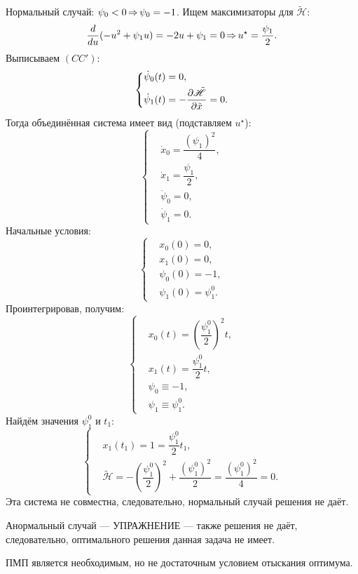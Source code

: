\begin{example}
    Нормальный случай: $\psi_0 < 0 \operatorname*{\Rightarrow} \psi_0 = -1$. Ищем максимизаторы для $\tilde{\mathscr{H}}$:
    $$
        \dfrac{d}{du}(-u^2 + \psi_1 u) = -2u + \psi_1 = 0 \operatorname*{\Rightarrow} u^{\star} = \dfrac{\psi_1}{2}.
    $$
    Выписываем $(CC')$:
    $$
        \left\{
            \begin{aligned}
                & \dot{\psi}_0(t) = 0, \\
                & \dot{\psi}_1(t) = - \dfrac{\partial \tilde{\mathscr{H}}}{\partial \tilde{x}} = 0.
            \end{aligned}
        \right.
    $$
    Тогда объединённая система имеет вид (подставляем $u^{\star}$):
    $$
        \left\{
            \begin{aligned}
                & \dot{x}_0 = \dfrac{(\psi_1)^2}{4}, \\
                & \dot{x}_1 = \dfrac{\psi_1}{2}, \\
                & \dot{\psi}_0 = 0, \\
                & \dot{\psi}_1 = 0.
            \end{aligned}
        \right.
    $$
    Начальные условия:
    $$
        \left\{
            \begin{aligned}
                & x_0(0) = 0, \\
                & x_1(0) = 0, \\
                & \psi_0(0) = -1, \\
                & \psi_1(0) = \psi_1^0.
            \end{aligned}
        \right.
    $$
    Проинтегрировав, получим:
    $$
        \left\{
            \begin{aligned}
                & x_0(t) = \left(\dfrac{\psi_1^0}{2}\right)^2 t, \\
                & x_1(t) = \dfrac{\psi_1^0}{2} t, \\
                & \psi_0 \equiv -1, \\
                & \psi_1 \equiv \psi_1^0.
            \end{aligned}
        \right.
    $$
    Найдём значения $\psi_1^0$ и $t_1$:
    $$
        \left\{
            \begin{aligned}
                & x_1(t_1) = 1 = \dfrac{\psi_1^0}{2} t_1, \\
                & \tilde{\mathscr{H}} = - \left(\dfrac{\psi_1^0}{2}\right)^2 + \dfrac{(\psi_1^0)^2}{2} = \dfrac{(\psi_1^0)^2}{4} = 0.
            \end{aligned}
        \right.
    $$
    Эта система не совместна, следовательно, нормальный случай решения не даёт.

    Анормальный случай --- УПРАЖНЕНИЕ --- также решения не даёт, следовательно, оптимального решения данная задача не имеет.
\end{example}

\begin{remark}
    ПМП является необходимым, но не достаточным условием отыскания оптимума.
\end{remark}